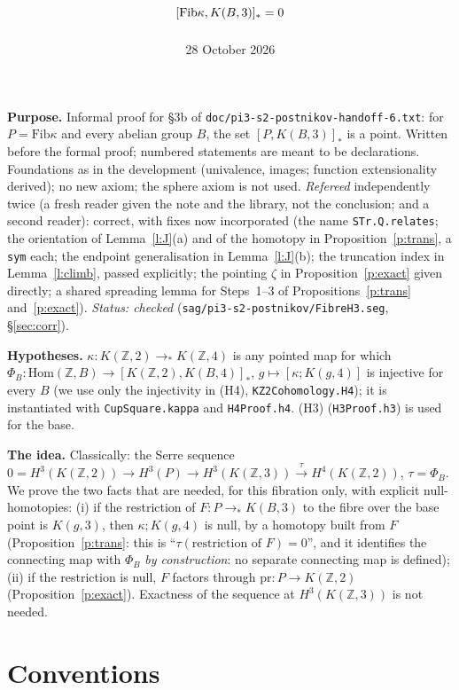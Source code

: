 \documentclass[11pt]{amsart}
\title{$\hc{\Fib\kappa}{K(B,3)}=0$}
\date{28 October 2026}
\theoremstyle{definition}
\theoremstyle{remark}
\newcommand{\Z}{\mathbb{Z}}
\newcommand{\code}[1]{\texttt{#1}}
\newcommand{\Hom}{\mathrm{Hom}}
\newcommand{\hc}[2]{[#1,#2]_*}
\newcommand{\Fib}{\mathrm{Fib}}
\begin{document}
\maketitle

\noindent\textbf{Purpose.} Informal proof for \S3b of
\code{doc/pi3-s2-postnikov-handoff-6.txt}: for $P=\Fib\kappa$ and every
abelian group $B$, the set $\hc P{K(B,3)}$ is a point. Written before
the formal proof; numbered statements are meant to be declarations.
Foundations as in the development (univalence, images; function
extensionality derived); no new axiom; the sphere axiom is not used.
\emph{Refereed} independently twice (a fresh reader given the note and the
library, not the conclusion; and a second reader): correct, with fixes
now incorporated (the name \code{STr.Q.relates}; the orientation of
Lemma~\ref{l:J}(a) and of the homotopy in Proposition~\ref{p:trans}, a
\code{sym} each; the endpoint generalisation in Lemma~\ref{l:J}(b); the
truncation index in Lemma~\ref{l:climb}, passed explicitly; the pointing
$\zeta$ in Proposition~\ref{p:exact} given directly; a shared spreading
lemma for Steps~1--3 of Propositions~\ref{p:trans} and~\ref{p:exact}).
\emph{Status: checked} (\code{sag/pi3-s2-postnikov/FibreH3.seg}, \S\ref{sec:corr}).

\smallskip\noindent\textbf{Hypotheses.} $\kappa:K(\Z,2)\to_*K(\Z,4)$ is
any pointed map for which $\Phi_B:\Hom(\Z,B)\to\hc{K(\Z,2)}{K(B,4)}$,
$g\mapsto[\kappa;K(g,4)]$ is injective for every $B$ (we use only the
injectivity in (H4), \code{KZ2Cohomology.H4}); it is instantiated with
\code{CupSquare.kappa} and \code{H4Proof.h4}. (H3)
(\code{H3Proof.h3}) is used for the base.

\smallskip\noindent\textbf{The idea.} Classically: the Serre sequence
$0=H^3(K(\Z,2))\to H^3(P)\to H^3(K(\Z,3))\xrightarrow{\tau}H^4(K(\Z,2))$,
$\tau=\Phi_B$. We prove the two facts that are needed, for this fibration
only, with explicit null-homotopies: (i) if the restriction of
$F:P\to_*K(B,3)$ to the fibre over the base point is $K(g,3)$, then
$\kappa;K(g,4)$ is null, by a homotopy built from $F$
(Proposition~\ref{p:trans}: this is ``$\tau(\text{restriction of }F)=0$'',
and it identifies the connecting map with $\Phi_B$ \emph{by
construction}: no separate connecting map is defined); (ii) if the
restriction is null, $F$ factors through $\mathrm{pr}:P\to K(\Z,2)$
(Proposition~\ref{p:exact}). Exactness of the sequence at
$H^3(K(\Z,3))$ is not needed.

\section{Conventions}
\end{document}
